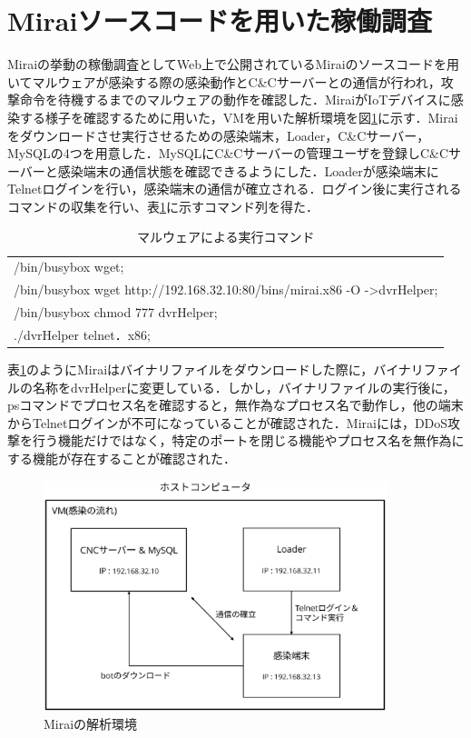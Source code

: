 \section{Miraiソースコードを用いた稼働調査}
Miraiの挙動の稼働調査としてWeb上で公開されているMiraiのソースコード\cite{code}を用いてマルウェアが感染する際の感染動作とC\&Cサーバーとの通信が行われ，攻撃命令を待機するまでのマルウェアの動作を確認した．MiraiがIoTデバイスに感染する様子を確認するために用いた，VMを用いた解析環境を図\ref{fig:kaiseki}に示す．Miraiをダウンロードさせ実行させるための感染端末，Loader，C\&Cサーバー，MySQLの4つを用意した．MySQLにC\&Cサーバーの管理ユーザを登録しC\&Cサーバーと感染端末の通信状態を確認できるようにした．Loaderが感染端末にTelnetログインを行い，感染端末の通信が確立される．ログイン後に実行されるコマンドの収集を行い、表\ref{tab:malware}に示すコマンド列を得た．
\begin{table}[t]
   \caption{マルウェアによる実行コマンド}
   \label{tab:malware}
   \centering
\begin{tabular}{p{7cm}}
\hline
/bin/busybox wget;\\
/bin/busybox wget http://192.168.32.10:80/bins/mirai.x86 -O -\textgreater dvrHelper;\\
/bin/busybox chmod 777 dvrHelper;\\
./dvrHelper telnet．x86;\\
\hline
\end{tabular}
\end{table}
表\ref{tab:malware}のようにMiraiはバイナリファイルをダウンロードした際に，バイナリファイルの名称をdvrHelperに変更している．しかし，バイナリファイルの実行後に，psコマンドでプロセス名を確認すると，無作為なプロセス名で動作し，他の端末からTelnetログインが不可になっていることが確認された．Miraiには，DDoS攻撃を行う機能だけではなく，特定のポートを閉じる機能やプロセス名を無作為にする機能が存在することが確認された．
 \begin{figure}[h]
 \centering
    \includegraphics[width=100mm]{figures/VM.eps}
    \caption{Miraiの解析環境}
 \label{fig:kaiseki}
 \end{figure}
 \newpage


